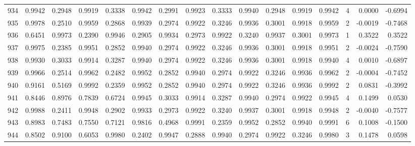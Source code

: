 \begin{tabular}{lrrrrrrrrrrrrrrr}
934 &      0.9942 &  0.2948 &  0.9919 &  0.3338 &  0.9942 &  0.2991 &  0.9923 &  0.3333 &  0.9940 &  0.2948 &   0.9919 &     0.9942 &      4 &                    0.0000 &                    -0.6994 \\
935 &      0.9978 &  0.2510 &  0.9959 &  0.2868 &  0.9939 &  0.2974 &  0.9922 &  0.3246 &  0.9936 &  0.3001 &   0.9918 &     0.9959 &      2 &                   -0.0019 &                    -0.7468 \\
936 &      0.6451 &  0.9973 &  0.2390 &  0.9946 &  0.2905 &  0.9934 &  0.2973 &  0.9922 &  0.3240 &  0.9937 &   0.3001 &     0.9973 &      1 &                    0.3522 &                     0.3522 \\
937 &      0.9975 &  0.2385 &  0.9951 &  0.2852 &  0.9940 &  0.2974 &  0.9922 &  0.3246 &  0.9936 &  0.3001 &   0.9918 &     0.9951 &      2 &                   -0.0024 &                    -0.7590 \\
938 &      0.9930 &  0.3033 &  0.9914 &  0.3287 &  0.9940 &  0.2974 &  0.9922 &  0.3246 &  0.9936 &  0.3001 &   0.9918 &     0.9940 &      4 &                    0.0010 &                    -0.6897 \\
939 &      0.9966 &  0.2514 &  0.9962 &  0.2482 &  0.9952 &  0.2852 &  0.9940 &  0.2974 &  0.9922 &  0.3246 &   0.9936 &     0.9962 &      2 &                   -0.0004 &                    -0.7452 \\
940 &      0.9161 &  0.5169 &  0.9992 &  0.2359 &  0.9952 &  0.2852 &  0.9940 &  0.2974 &  0.9922 &  0.3246 &   0.9936 &     0.9992 &      2 &                    0.0831 &                    -0.3992 \\
941 &      0.8446 &  0.8976 &  0.7839 &  0.6724 &  0.9945 &  0.3033 &  0.9914 &  0.3287 &  0.9940 &  0.2974 &   0.9922 &     0.9945 &      4 &                    0.1499 &                     0.0530 \\
942 &      0.9988 &  0.2411 &  0.9948 &  0.2902 &  0.9933 &  0.2973 &  0.9922 &  0.3240 &  0.9937 &  0.3001 &   0.9918 &     0.9948 &      2 &                   -0.0040 &                    -0.7577 \\
943 &      0.8983 &  0.7483 &  0.7550 &  0.7121 &  0.9816 &  0.4968 &  0.9991 &  0.2359 &  0.9952 &  0.2852 &   0.9940 &     0.9991 &      6 &                    0.1008 &                    -0.1500 \\
944 &      0.8502 &  0.9100 &  0.6053 &  0.9980 &  0.2402 &  0.9947 &  0.2888 &  0.9940 &  0.2974 &  0.9922 &   0.3246 &     0.9980 &      3 &                    0.1478 &                     0.0598 \\

\end{tabular}
